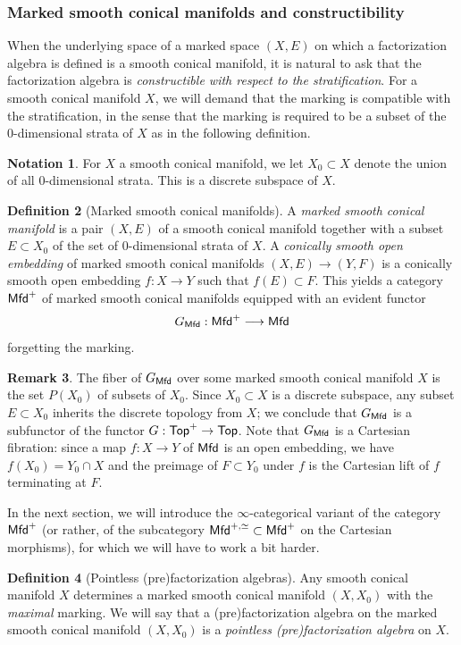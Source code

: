 \documentclass[10pt, reqno, twoside
, final
]{amsart}
\numberwithin{equation}{subsection}%
\theoremstyle{definition}
\newtheorem{defn}{Definition}[subsection]
\theoremstyle{definition}
\theoremstyle{definition}
\newtheorem{nota}[defn]{Notation}
\theoremstyle{definition}
\theoremstyle{definition}
\theoremstyle{definition}
\theoremstyle{definition}
\theoremstyle{definition}
\theoremstyle{definition}
\theoremstyle{plain}
\theoremstyle{definition}
\theoremstyle{plain}
\theoremstyle{definition}
\theoremstyle{plain}
\theoremstyle{definition}
\newtheorem{rmk}[defn]{Remark}
\theoremstyle{definition}
\theoremstyle{plain}
\theoremstyle{plain}
\theoremstyle{definition}
\theoremstyle{plain}
\theoremstyle{plain}
\theoremstyle{plain}
\begin{document}
\subsubsection{Marked smooth conical manifolds and constructibility}
When the underlying space of a marked space $(X,E)$ on which a factorization algebra is defined is a smooth conical manifold, it is natural to ask that the factorization algebra is \emph{constructible with respect to the stratification}. For a smooth conical manifold $X$, we will demand that the marking is compatible with the stratification, in the sense that the marking is required to be a subset of the 0-dimensional strata of $X$ as in the following definition.
\begin{nota}
For $X$ a smooth conical manifold, we let $X_0\subset X$ denote the union of all 0-dimensional strata. This is a discrete subspace of $X$.    
\end{nota}
\begin{defn}[Marked smooth conical manifolds]\label{defn:markedsmcon}
A \emph{marked smooth conical manifold} is a pair $(X,E)$ of a smooth conical manifold together with a subset $E\subset X_0$ of the set of 0-dimensional strata of $X$. A \emph{conically smooth open embedding} of marked smooth conical manifolds $(X,E)\rightarrow (Y,F)$ is a conically smooth open embedding $f:X\rightarrow Y$ such that $f(E)\subset F$. This yields a category $\mathsf{Mfd}^+$ of marked smooth conical manifolds equipped with an evident functor 
\[  G_{\mathsf{Mfd}}:\mathsf{Mfd}^+\longrightarrow \mathsf{Mfd} \]
forgetting the marking.
\end{defn}
\begin{rmk}
The fiber of $G_{\mathsf{Mfd}}$ over some marked smooth conical manifold $X$ is the set $P(X_0)$ of subsets of $X_0$. Since $X_0\subset X$ is a discrete subspace, any subset $E\subset X_0$ inherits the discrete topology from $X$; we conclude that $G_{\mathsf{Mfd}}$ is a subfunctor of the functor $G:\mathsf{Top}^+\rightarrow\mathsf{Top}$. Note that $G_{\mathsf{Mfd}}$ is a Cartesian fibration: since a map $f:X\rightarrow Y$ of $\mathsf{Mfd}$ is an open embedding, we have $f(X_0)=Y_0\cap X$ and the preimage of $F\subset Y_0$ under $f$ is the Cartesian lift of $f$ terminating at $F$.
\end{rmk}


In the next section, we will introduce the $\infty$-categorical variant of the category $\mathsf{Mfd}^+$ (or rather, of the subcategory $\mathsf{Mfd}^{+,\simeq}\subset \mathsf{Mfd}^+$ on the Cartesian morphisms), for which we will have to work a bit harder. 
\begin{defn}[Pointless (pre)factorization algebras]
Any smooth conical manifold $X$ determines a marked smooth conical manifold $(X,X_0)$ with the \emph{maximal} marking. We will say that a (pre)factorization algebra on the marked smooth conical manifold $(X,X_0)$ is a \emph{pointless (pre)factorization algebra} on $X$.
\end{defn}
\end{document}
